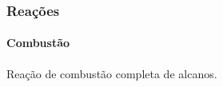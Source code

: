 \begin{frame}
\frametitle{Reações}
\framesubtitle{Combustão}

Reação de combustão completa de alcanos.

\begin{figure}
\centering
{}
\end{figure}

\end{frame}
